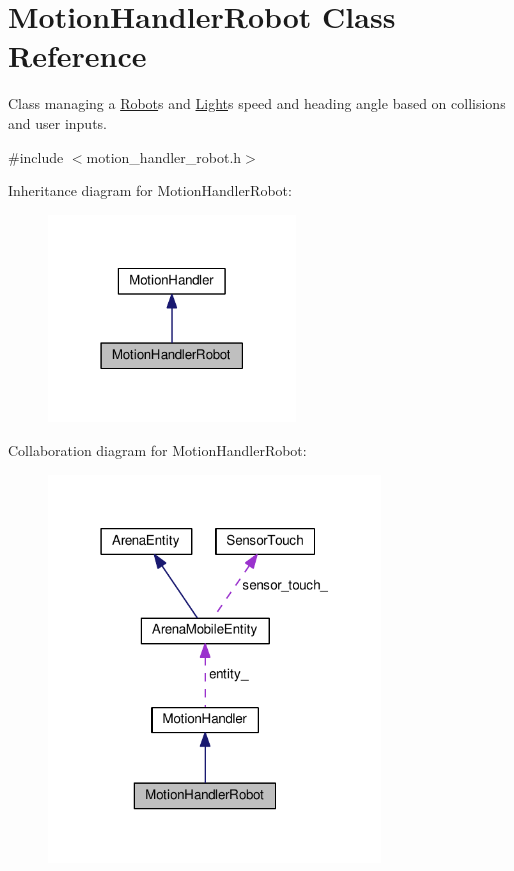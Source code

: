 \hypertarget{classMotionHandlerRobot}{}\section{Motion\+Handler\+Robot Class Reference}
\label{classMotionHandlerRobot}


Class managing a \hyperlink{classRobot}{Robot}\textquotesingle{}s and \hyperlink{classLight}{Light}\textquotesingle{}s speed and heading angle based on collisions and user inputs.  




{\ttfamily \#include $<$motion\+\_\+handler\+\_\+robot.\+h$>$}



Inheritance diagram for Motion\+Handler\+Robot\+:\nopagebreak
\begin{figure}[H]
\begin{center}
\leavevmode
\includegraphics[width=186pt]{classMotionHandlerRobot__inherit__graph}
\end{center}
\end{figure}


Collaboration diagram for Motion\+Handler\+Robot\+:\nopagebreak
\begin{figure}[H]
\begin{center}
\leavevmode
\includegraphics[width=250pt]{classMotionHandlerRobot__coll__graph}
\end{center}
\end{figure}
